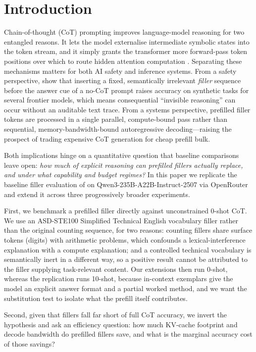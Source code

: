 \documentclass[11pt,a4paper]{article}
\begin{document}
\section{Introduction}

Chain-of-thought (CoT) prompting \citep{wei2022cot} improves language-model
reasoning for two entangled reasons. It lets the model externalise intermediate
symbolic states into the token stream, and it simply grants the transformer more
forward-pass token positions over which to route hidden attention computation
\citep{pfau2024dot,goyal2024pause}. Separating these mechanisms matters for both
AI safety and inference systems. From a safety perspective,
\citet{baherwani2026not} show that inserting a fixed, semantically irrelevant
\emph{filler} sequence before the answer cue of a no-CoT prompt raises accuracy
on synthetic tasks for several frontier models, which means consequential
``invisible reasoning'' can occur without an auditable text trace. From a systems
perspective, prefilled filler tokens are processed in a single parallel,
compute-bound pass rather than sequential, memory-bandwidth-bound autoregressive
decoding---raising the prospect of trading expensive CoT generation for cheap
prefill bulk.

Both implications hinge on a quantitative question that baseline comparisons
leave open: \emph{how much of explicit reasoning can prefilled fillers actually
replace, and under what capability and budget regimes?} In this paper we
replicate the baseline filler evaluation of \citet{baherwani2026not} on
Qwen3-235B-A22B-Instruct-2507 via OpenRouter \citep{openrouter2026} and extend it
across three progressively broader experiments.

First, we benchmark a prefilled filler directly against unconstrained 0-shot CoT.
We use an ASD-STE100 Simplified Technical English vocabulary filler rather than
the original counting sequence, for two reasons: counting fillers share surface
tokens (digits) with arithmetic problems, which confounds a lexical-interference
explanation with a compute explanation; and a controlled technical vocabulary is
semantically inert in a different way, so a positive result cannot be attributed
to the filler supplying task-relevant content. Our extensions then run 0-shot,
whereas the replication runs 10-shot, because in-context exemplars give the model
an explicit answer format and a partial worked method, and we want the
substitution test to isolate what the prefill itself contributes.

Second, given that fillers fall far short of full CoT accuracy, we invert the
hypothesis and ask an efficiency question: how much KV-cache footprint and decode
bandwidth do prefilled fillers save, and what is the marginal accuracy cost of
those savings?
\end{document}
